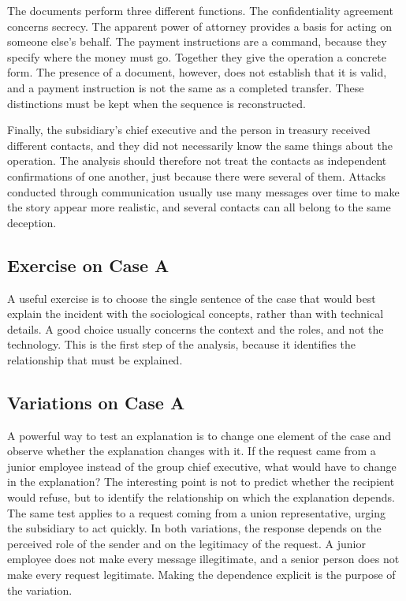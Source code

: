 The documents perform three different functions. The confidentiality agreement concerns secrecy. The apparent power of attorney provides a basis for acting on someone else's behalf. The payment instructions are a command, because they specify where the money must go. Together they give the operation a concrete form. The presence of a document, however, does not establish that it is valid, and a payment instruction is not the same as a completed transfer. These distinctions must be kept when the sequence is reconstructed.

Finally, the subsidiary's chief executive and the person in treasury received different contacts, and they did not necessarily know the same things about the operation. The analysis should therefore not treat the contacts as independent confirmations of one another, just because there were several of them. Attacks conducted through communication usually use many messages over time to make the story appear more realistic, and several contacts can all belong to the same deception.

\subsection{Exercise on Case A}
A useful exercise is to choose the single sentence of the case that would best explain the incident with the sociological concepts, rather than with technical details. A good choice usually concerns the context and the roles, and not the technology. This is the first step of the analysis, because it identifies the relationship that must be explained.

\subsection{Variations on Case A}
A powerful way to test an explanation is to change one element of the case and observe whether the explanation changes with it. If the request came from a junior employee instead of the group chief executive, what would have to change in the explanation? The interesting point is not to predict whether the recipient would refuse, but to identify the relationship on which the explanation depends. The same test applies to a request coming from a union representative, urging the subsidiary to act quickly. In both variations, the response depends on the perceived role of the sender and on the legitimacy of the request. A junior employee does not make every message illegitimate, and a senior person does not make every request legitimate. Making the dependence explicit is the purpose of the variation.

